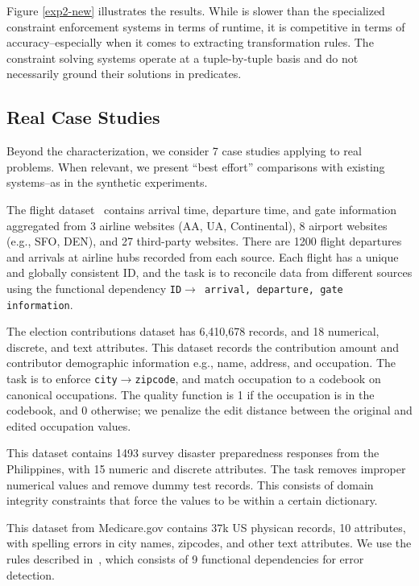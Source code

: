 Figure \ref{exp2-new} illustrates the results. While \sys is slower than the specialized constraint enforcement systems in terms of runtime, it is competitive in terms of accuracy--especially when it comes to extracting transformation rules. The constraint solving systems operate at a tuple-by-tuple basis and do not necessarily ground their solutions in predicates.

\subsection{Real Case Studies}
Beyond the characterization, we consider 7 case studies applying \sys to real problems. When relevant, we present ``best effort'' comparisons with existing systems--as in the synthetic experiments.

 The flight dataset~\cite{data-flights} contains arrival time, departure time, and gate information aggregated from 3 airline websites (AA, UA, Continental), 8 airport websites (e.g., SFO, DEN), and 27 third-party websites.
There are 1200 flight departures and arrivals at airline hubs recorded from each source.  Each flight has a unique and globally consistent ID, and the task is to reconcile data from different sources using the functional dependency \texttt{ID$\rightarrow$ arrival, departure, gate information}.


 The election contributions dataset has 6,410,678 records, and 18 numerical, discrete, and text attributes. This dataset records the contribution amount and contributor demographic information e.g., name, address, and occupation.  The task is to enforce \texttt{city$\rightarrow$zipcode}, and match occupation to a codebook on canonical occupations.  The quality function is 1 if the occupation is in the codebook, and 0 otherwise; we penalize the edit distance between the original and edited occupation values.

 This dataset contains 1493 survey disaster preparedness responses from the Philippines, with 15 numeric and discrete attributes. The task removes improper numerical values and remove dummy test records. This consists of domain integrity constraints that force the values to be within a certain dictionary.

 This dataset from Medicare.gov contains 37k US physican records, 10 attributes, with spelling errors in city names, zipcodes, and other text attributes. We use the rules described in~\cite{rekatsinas2017holoclean}, which consists of 9 functional dependencies for error detection. 

